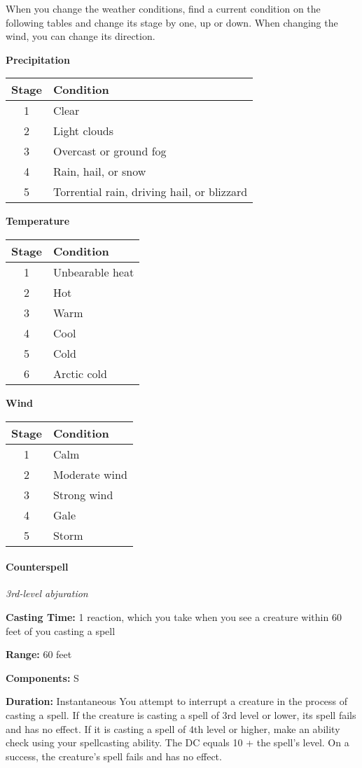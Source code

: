 \documentclass[
]{article}
\begin{document}
When you change the weather conditions, find a current condition on the
following tables and change its stage by one, up or down. When changing
the wind, you can change its direction.

\textbf{Precipitation}

\begin{longtable}[]{@{}cl@{}}
\toprule
Stage & Condition\tabularnewline
\midrule
\endhead
1 & Clear\tabularnewline
2 & Light clouds\tabularnewline
3 & Overcast or ground fog\tabularnewline
4 & Rain, hail, or snow\tabularnewline
5 & Torrential rain, driving hail, or blizzard\tabularnewline
\bottomrule
\end{longtable}

\textbf{Temperature}

\begin{longtable}[]{@{}cl@{}}
\toprule
Stage & Condition\tabularnewline
\midrule
\endhead
1 & Unbearable heat\tabularnewline
2 & Hot\tabularnewline
3 & Warm\tabularnewline
4 & Cool\tabularnewline
5 & Cold\tabularnewline
6 & Arctic cold\tabularnewline
\bottomrule
\end{longtable}

\textbf{Wind}

\begin{longtable}[]{@{}cl@{}}
\toprule
Stage & Condition\tabularnewline
\midrule
\endhead
1 & Calm\tabularnewline
2 & Moderate wind\tabularnewline
3 & Strong wind\tabularnewline
4 & Gale\tabularnewline
5 & Storm\tabularnewline
\bottomrule
\end{longtable}

\hypertarget{counterspell}{%
\paragraph{Counterspell}\label{counterspell}}

\emph{3rd-level abjuration}

\textbf{Casting Time:} 1 reaction, which you take when you see a
creature within 60 feet of you casting a spell

\textbf{Range:} 60 feet

\textbf{Components:} S

\textbf{Duration:} Instantaneous You attempt to interrupt a creature in
the process of casting a spell. If the creature is casting a spell of
3rd level or lower, its spell fails and has no effect. If it is casting
a spell of 4th level or higher, make an ability check using your
spellcasting ability. The DC equals 10 + the spell's level. On a
success, the creature's spell fails and has no effect.
\end{document}
